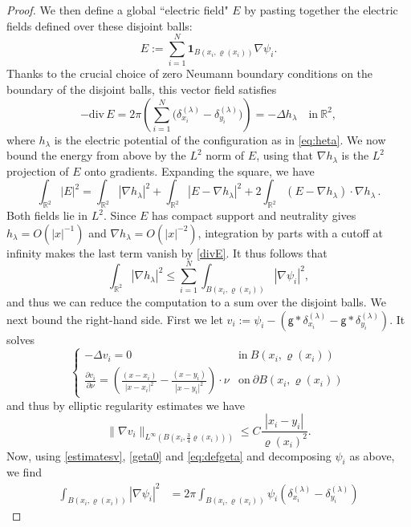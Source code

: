 \documentclass[a4paper,10pt,leqno]{amsart}
\numberwithin{equation}{section}
\newcommand{\R}{\mathbb{R}}
\def\div{\mathrm{div} \,}
\def\nab{\nabla}
\def\indic{\mathbf{1}}
\def\g{\mathsf{g}}
\begin{document}
\begin{proof}
  We then define a global ``electric field" $E$ by pasting together the electric fields defined over these disjoint balls:
  \[E:= \sum_{i=1}^N \indic_{B(x_i, \varrho(x_i))} \nab \psi_i.\]
  Thanks to the crucial choice of zero Neumann boundary conditions on the boundary of the disjoint balls, this vector field satisfies
  \begin{equation}\label{divE}
    -\div E= 2\pi \left(\sum_{i=1}^N \bigl(\delta_{x_i}^{(\lambda)} -\delta_{y_i}^{(\lambda)}\bigr)\right) = -\Delta h_\lambda \quad \text{in} \ \R^2,\end{equation}
  where $h_\lambda$ is the electric potential of the configuration as in \eqref{eq:heta}.
  We now bound the energy from above by the $L^2$ norm of $E$, using that $\nab h_\lambda$ is the $L^2$ projection of $E$ onto gradients. Expanding the square, we have
  \[
    \int_{\R^2} |E|^2= \int_{\R^2} |\nab h_\lambda|^2 + \int_{\R^2}|E- \nab h_\lambda|^2 + 2 \int_{\R^2} (E-\nab h_\lambda) \cdot \nab h_\lambda\,.
  \]
  Both fields lie in $L^2$. Since $E$ has compact support and neutrality gives $h_\lambda=O(|x|^{-1})$ and $\nab h_\lambda=O(|x|^{-2})$, integration by parts with a cutoff at infinity makes the last term vanish by \eqref{divE}. It thus follows that
  \begin{equation}\label{hui}\int_{\R^2} |\nab h_\lambda|^2 \leq \sum_{i=1}^N \int_{B(x_i, \varrho(x_i)) } |\nab \psi_i|^2, \end{equation} and thus we can reduce the computation to a sum over the disjoint balls.
  We next bound the right-hand side.
  First we let $v_i:= \psi_i - (\g*\delta_{x_i}^{(\lambda)} - \g*\delta_{y_i}^{(\lambda)})$. It solves
  \[\left\{ \begin{array}{ll}
    -\Delta v_i= 0 & \text{in} \ B(x_i, \varrho(x_i))\\
    \frac{\partial v_i}{\partial \nu}= \left( \frac{(x-x_i)}{|x-x_i|^2} - \frac{(x-y_i)}{|x-y_i|^2} \right) \cdot \nu & \text{on} \ \partial B(x_i, \varrho(x_i))\end{array}\right.
  \]
  and thus by elliptic regularity estimates we have
  \begin{equation}\label{estimatesv}
    \|\nab v_i\|_{L^\infty(B(x_i, \frac34 \varrho(x_i)))} \le C \frac{|x_i-y_i|}{\varrho(x_i)^2}
    .\end{equation}
  Now, using \eqref{estimatesv}, \eqref{geta0} and \eqref{eq:defgeta} and decomposing $\psi_i$ as above, we find
  \begin{align*}
    \int_{B(x_i, \varrho(x_i)) } |\nab \psi_i|^2 & = 2\pi \int_{B(x_i, \varrho(x_i)) } \psi_i \left(\delta_{x_i}^{(\lambda)} - \delta_{y_i}^{(\lambda)}\right)

\end{align*}
\end{proof}
\end{document}
